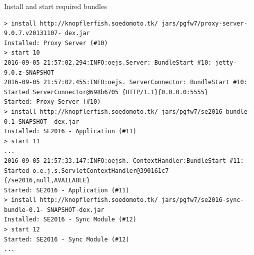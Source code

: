 \documentclass[conference]{IEEEtran}
\begin{document}
\begin{listing}
    \caption{Install and start required bundles}
    \begin{verbatim}
> install http://knopflerfish.soedomoto.tk/ jars/pgfw7/proxy-server-9.0.7.v20131107- dex.jar
Installed: Proxy Server (#10)
> start 10
2016-09-05 21:57:02.294:INFO:oejs.Server: BundleStart #10: jetty-9.0.z-SNAPSHOT
2016-09-05 21:57:02.455:INFO:oejs. ServerConnector: BundleStart #10: Started ServerConnector@698b6705 {HTTP/1.1}{0.0.0.0:5555}
Started: Proxy Server (#10)
> install http://knopflerfish.soedomoto.tk/ jars/pgfw7/se2016-bundle-0.1-SNAPSHOT- dex.jar
Installed: SE2016 - Application (#11)
> start 11
...
2016-09-05 21:57:33.147:INFO:oejsh. ContextHandler:BundleStart #11: Started o.e.j.s.ServletContextHandler@390161c7 {/se2016,null,AVAILABLE}
Started: SE2016 - Application (#11)
> install http://knopflerfish.soedomoto.tk/ jars/pgfw7/se2016-sync-bundle-0.1- SNAPSHOT-dex.jar
Installed: SE2016 - Sync Module (#12)
> start 12
Started: SE2016 - Sync Module (#12)
...
	\end{verbatim}
    \label{lst:start-bundle-remote}
\end{listing}




%
%

\end{document}
